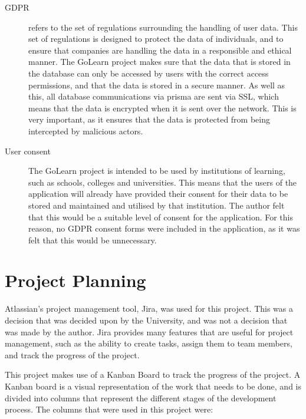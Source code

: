 \documentclass[11pt, a4paper,twoside]{report}
\theoremstyle{plain} %
\theoremstyle{definition} %
\numberwithin{equation}{chapter}
\begin{document}
\begin{description}
    \item[GDPR\cite{gdpr}] {
        refers to the set of regulations surrounding the handling of user
        data. This set of regulations is designed to protect the data of
        individuals, and to ensure that companies are handling the data in a
        responsible and ethical manner. The GoLearn project makes sure that
        the data that is stored in the database can only be accessed by users
        with the correct access permissions, and that the data is stored in a
        secure manner. As well as this, all database communications via prisma
        are sent via SSL, which means that the data is encrypted when it is
        sent over the network. This is very important, as it ensures that the
        data is protected from being intercepted by malicious actors.
        }

    \item[User consent] {
        The GoLearn project is intended to be used by institutions of learning,
        such as schools, colleges and universities. This means that the users
        of the application will already have provided their consent for their
        data to be stored and maintained and utilised by that institution. The
        author felt that this would be a suitable level of consent for the
        application. For this reason, no GDPR consent forms were included in
        the application, as it was felt that this would be unnecessary.
        }
\end{description}

\chapter{Project Planning}\label{ch:projectplanning}

Atlassian's project management tool, Jira, was used for this project.
This was a decision that was decided upon by the University, and was not
a decision that was made by the author. Jira provides many features that
are useful for project management, such as the ability to create tasks,
assign them to team members, and track the progress of the project.

This project makes use of a Kanban Board to track the progress of the project.
A Kanban board is a visual representation of the work that needs to be done,
and is divided into columns that represent the different stages of the
development process. The columns that were used in this project were:
\end{document}
